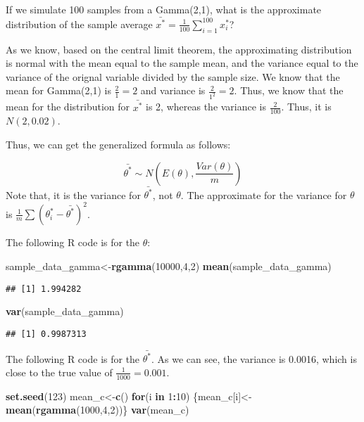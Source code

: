 \documentclass[]{book}
\newenvironment{Shaded}{\begin{snugshade}}{\end{snugshade}}
\newcommand{\KeywordTok}[1]{\textcolor[rgb]{0.13,0.29,0.53}{\textbf{#1}}}
\newcommand{\DecValTok}[1]{\textcolor[rgb]{0.00,0.00,0.81}{#1}}
\newcommand{\ControlFlowTok}[1]{\textcolor[rgb]{0.13,0.29,0.53}{\textbf{#1}}}
\newcommand{\OperatorTok}[1]{\textcolor[rgb]{0.81,0.36,0.00}{\textbf{#1}}}
\newcommand{\NormalTok}[1]{#1}
\begin{document}
If we simulate 100 samples from a Gamma(2,1), what is the approximate
distribution of the sample average
\(\bar{x^*}=\frac{1}{100} \sum_{i=1}^{100} x_i^*\)?

As we know, based on the central limit theorem, the approximating
distribution is normal with the mean equal to the sample mean, and the
variance equal to the variance of the orignal variable divided by the
sample size. We know that the mean for Gamma(2,1) is \(\frac{2}{1}=2\)
and variance is \(\frac{2}{1^2}=2\). Thus, we know that the mean for the
distribution for \(\bar{x^*}\) is 2, whereas the variance is
\(\frac{2}{100}\). Thus, it is \(N(2,0.02)\).

Thus, we can get the generalized formula as follows:

\[\bar{\theta^*} \sim N(E(\theta), \frac{Var(\theta)}{m})\] Note that,
it is the variance for \(\bar{\theta^*}\), not \(\theta\). The
approximate for the variance for \(\theta\) is
\(\frac{1}{m}\sum(\theta_i^*-\bar{\theta^*})^2\).

The following R code is for the \(\theta\):

\begin{Shaded}
\begin{Highlighting}[]
\NormalTok{sample_data_gamma<-}\KeywordTok{rgamma}\NormalTok{(}\DecValTok{10000}\NormalTok{,}\DecValTok{4}\NormalTok{,}\DecValTok{2}\NormalTok{)}
\KeywordTok{mean}\NormalTok{(sample_data_gamma)}
\end{Highlighting}
\end{Shaded}

\begin{verbatim}
## [1] 1.994282
\end{verbatim}

\begin{Shaded}
\begin{Highlighting}[]
\KeywordTok{var}\NormalTok{(sample_data_gamma)}
\end{Highlighting}
\end{Shaded}

\begin{verbatim}
## [1] 0.9987313
\end{verbatim}

The following R code is for the \(\bar{\theta^*}\). As we can see, the
variance is 0.0016, which is close to the true value of
\(\frac{1}{1000}=0.001\).

\begin{Shaded}
\begin{Highlighting}[]
\KeywordTok{set.seed}\NormalTok{(}\DecValTok{123}\NormalTok{)}
\NormalTok{mean_c<-}\KeywordTok{c}\NormalTok{()}
\ControlFlowTok{for}\NormalTok{(i }\ControlFlowTok{in} \DecValTok{1}\OperatorTok{:}\DecValTok{10}\NormalTok{)}
\NormalTok{\{mean_c[i]<-}\KeywordTok{mean}\NormalTok{(}\KeywordTok{rgamma}\NormalTok{(}\DecValTok{1000}\NormalTok{,}\DecValTok{4}\NormalTok{,}\DecValTok{2}\NormalTok{))\}}
\KeywordTok{var}\NormalTok{(mean_c)}
\end{Highlighting}
\end{Shaded}
\end{document}
